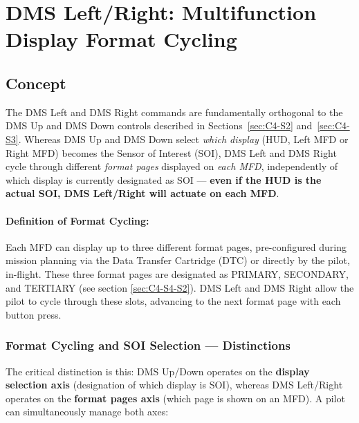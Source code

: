 \documentclass[11pt, a4paper, twoside]{report}
\begin{document}
\section{DMS Left/Right: Multifunction Display Format Cycling}
\label{sec:C4-S4}


\subsection{Concept}
\label{sec:C4-S4-S1}

The DMS Left and DMS Right commands are fundamentally orthogonal to the DMS Up and DMS Down controls described in Sections~\ref{sec:C4-S2} and~\ref{sec:C4-S3}. Whereas DMS Up and DMS Down select \textit{which display} (HUD, Left MFD or Right MFD) becomes the Sensor of Interest (SOI), DMS Left and DMS Right cycle through different \textit{format pages} displayed on \textit{each MFD}, independently of which display is currently designated as SOI --- \textbf{even if the HUD is the actual SOI, DMS Left/Right will actuate on each MFD}.

\paragraph{Definition of Format Cycling:}

Each MFD can display up to three different format pages, pre-configured during mission planning via the Data Transfer Cartridge (DTC) or directly by the pilot, in-flight. These three format pages are designated as PRIMARY, SECONDARY, and TERTIARY (see section \ref{sec:C4-S4-S2}). DMS Left and DMS Right allow the pilot to cycle through these slots, advancing to the next format page with each button press.
\subsubsection{Format Cycling and SOI Selection --- Distinctions}
\label{sec:C4-S4-S1-S1}

The critical distinction is this: DMS Up/Down operates on the \textbf{display selection axis} (designation of which display is SOI), whereas DMS Left/Right operates on the \textbf{format pages axis} (which page is shown on an MFD). A pilot can simultaneously manage both axes:
\end{document}
